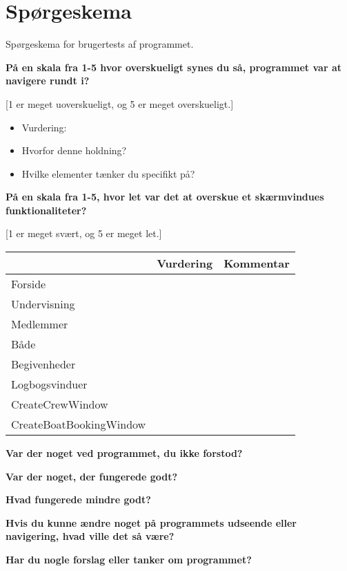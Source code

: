 \chapter{Spørgeskema}\label{bilag:SporgeSkema}
Spørgeskema for brugertests af programmet.

\textbf{På en skala fra 1-5 hvor overskueligt synes du så, programmet var at navigere rundt i?}

[1 er meget uoverskueligt, og 5 er meget overskueligt.]

\begin{itemize}
\item Vurdering: 
\item Hvorfor denne holdning? 
\item Hvilke elementer tænker du specifikt på?
\end{itemize}

\textbf{På en skala fra 1-5, hvor let var det at overskue et skærmvindues funktionaliteter?}

[1 er meget svært, og 5 er meget let.]

\begin{table}[H]\label{TabelVurdering}
    \begin{tabular}{l|l|l}
    ~                       & Vurdering & Kommentar \\ \hline
    Forside                 & ~         & ~         \\
    Undervisning            & ~         & ~         \\
    Medlemmer               & ~         & ~         \\
    Både                    & ~         & ~         \\
    Begivenheder            & ~         & ~         \\
    Logbogsvinduer          & ~         & ~         \\
    CreateCrewWindow        & ~         & ~         \\
    CreateBoatBookingWindow & ~         & ~         \\
    \end{tabular}
\end{table}

\textbf{Var der noget ved programmet, du ikke forstod?}

\textbf{Var der noget, der fungerede godt?}

\textbf{Hvad fungerede mindre godt?}

\textbf{Hvis du kunne ændre noget på programmets udseende eller navigering, hvad ville det så være?}

\textbf{Har du nogle forslag eller tanker om programmet?}
